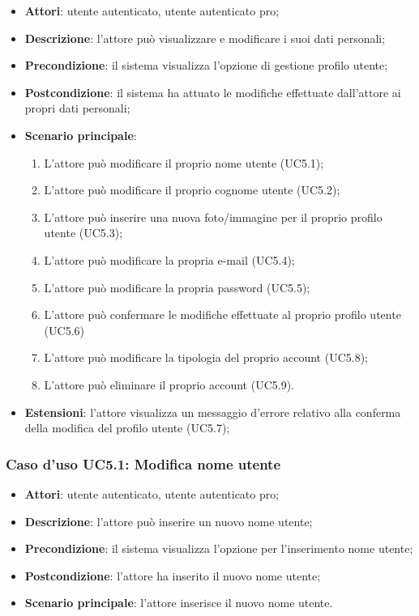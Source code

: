 \begin{itemize}
	\item \textbf{Attori}: utente autenticato, utente autenticato pro;
	\item \textbf{Descrizione}: l'attore può visualizzare e modificare i suoi dati personali;
	\item \textbf{Precondizione}: il sistema visualizza l'opzione di gestione profilo utente;
	\item \textbf{Postcondizione}: il sistema ha attuato le modifiche effettuate dall'attore ai propri dati personali;
	\item \textbf{Scenario principale}:
		\begin{enumerate}
			\item L'attore può modificare il proprio nome utente (UC5.1);
			\item L'attore può modificare il proprio cognome utente (UC5.2);
			\item L'attore può inserire una nuova foto/immagine per il proprio profilo utente (UC5.3);
			\item L'attore può modificare la propria e-mail (UC5.4);
			\item L'attore può modificare la propria password (UC5.5);
			\item L'attore può confermare le modifiche effettuate al proprio profilo utente (UC5.6)
			\item L'attore può modificare la tipologia del proprio account (UC5.8);
			\item L'attore può eliminare il proprio account (UC5.9).
		\end{enumerate} 
	\item \textbf{Estensioni}: l'attore visualizza un messaggio d'errore relativo alla conferma della modifica del profilo utente	(UC5.7);	 
\end{itemize}

\subsubsection{Caso d'uso UC5.1: Modifica nome utente}
\begin{itemize}
	\item \textbf{Attori}: utente autenticato, utente autenticato pro;
	\item \textbf{Descrizione}: l'attore può inserire un nuovo nome utente;
	\item \textbf{Precondizione}: il sistema visualizza l'opzione per l'inserimento nome utente;
	\item \textbf{Postcondizione}: l'attore ha inserito il nuovo nome utente;
	\item \textbf{Scenario principale}: l'attore inserisce il nuovo nome utente.
\end{itemize}

